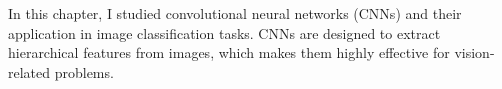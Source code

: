 In this chapter, I studied convolutional neural networks (CNNs) and their application in image classification tasks. CNNs are designed to extract hierarchical features from images, which makes them highly effective for vision-related problems.